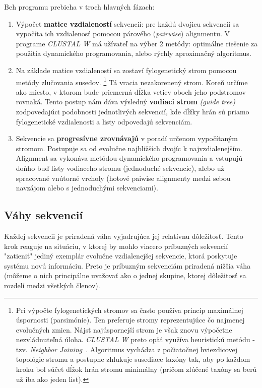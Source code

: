 \documentclass[nobib]{tufte-handout}
\newcommand{\tr}[1]{}%
\begin{document}
Beh programu prebieha v troch hlavných fázach:
\begin{enumerate}
\item Výpočet \textbf{matice vzdialeností} sekvencií: pre každú dvojicu sekvencií sa vypočíta ich \tr{evolučná} vzdialenosť pomocou párového (\emph{pairwise}) alignmentu. V programe \emph{CLUSTAL W} má užívateľ na výber 2 metódy: optimálne riešenie za použitia dynamického programovania, alebo rýchly aproximačný algoritmus.

\item Na základe matice vzdialeností sa zostaví fylogenetický strom pomocou metódy zlučovania susedov. 
\footnote{Pri výpočte fylogenetických stromov sa často používa princíp maximálnej úspornosti (parsimónie). Ten preferuje stromy reprezentujúce čo najmenej evolučných zmien. Nájsť najúspornejší strom je však znovu výpočetne nezvládnuteľná úloha. \emph{CLUSTAL W} preto opäť využíva heuristickú metódu - tzv. \emph{Neighbor Joining}~\citep{neighbor}. Algoritmus vychádza z počiatočnej hviezdicovej topológie stromu a postupne zhlukuje susediace taxóny tak, aby po každom kroku bol súčet dĺžok hrán stromu minimálny (pričom zlúčené taxóny sa berú už iba ako jeden list).} Tá vracia nezakorenený strom. Koreň určíme ako miesto, v ktorom bude priemerná dĺžka vetiev oboch jeho podstromov rovnaká. Tento postup nám dáva výsledný \textbf{vodiaci strom} \emph{(guide tree)} zodpovedajúci podobnosti jednotlivých sekvencií, kde dĺžky hrán sú priamo fylogenetické vzdialenosti a listy odpovedajú sekvenciám.

\item Sekvencie sa \textbf{progresívne zrovnávajú} v poradí určenom vypočítaným stromom. Postupuje sa od evolučne najbližších dvojíc k najvzdialenejším. Alignment sa vykonáva metódou dynamického programovania a vstupujú doňho buď listy vodiaceho stromu (jednoduché sekvencie), alebo už spracované vnútorné vrcholy (hotové paiwise alignmenty medzi sebou navzájom alebo s jednoduchými sekvenciami).
\end{enumerate}

\subsection{Váhy sekvencií}\label{sec:wights}

Každej sekvencii je priradená váha vyjadrujúca jej relatívnu dôležitosť. Tento krok reaguje na situáciu, v ktorej by mohlo viacero príbuzných sekvencií "zatieniť" jediný exemplár evolučne vzdialenejšej sekvencie, ktorá poskytuje systému novú informáciu. Preto je príbuzným sekvenciám priradená nižšia váha (môžeme o nich principálne uvažovať ako o jednej skupine, ktorej dôležitosť sa rozdelí medzi všetkých členov).
\end{document}
